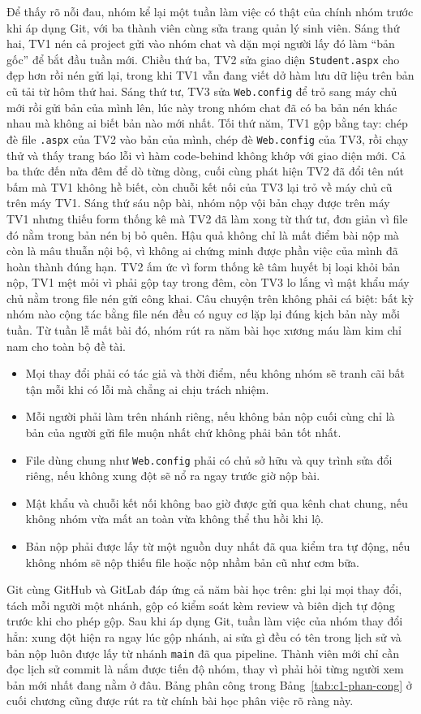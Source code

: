 Để thấy rõ nỗi đau, nhóm kể lại một tuần làm việc có thật của chính nhóm trước khi áp dụng Git, với ba thành viên cùng sửa trang quản lý sinh viên.
Sáng thứ hai, TV1 nén cả project gửi vào nhóm chat và dặn mọi người lấy đó làm ``bản gốc'' để bắt đầu tuần mới.
Chiều thứ ba, TV2 sửa giao diện \texttt{Student.aspx} cho đẹp hơn rồi nén gửi lại, trong khi TV1 vẫn đang viết dở hàm lưu dữ liệu trên bản cũ tải từ hôm thứ hai.
Sáng thứ tư, TV3 sửa \texttt{Web.config} để trỏ sang máy chủ mới rồi gửi bản của mình lên, lúc này trong nhóm chat đã có ba bản nén khác nhau mà không ai biết bản nào mới nhất.
Tối thứ năm, TV1 gộp bằng tay: chép đè file \texttt{.aspx} của TV2 vào bản của mình, chép đè \texttt{Web.config} của TV3, rồi chạy thử và thấy trang báo lỗi vì hàm code-behind không khớp với giao diện mới.
Cả ba thức đến nửa đêm để dò từng dòng, cuối cùng phát hiện TV2 đã đổi tên nút bấm mà TV1 không hề biết, còn chuỗi kết nối của TV3 lại trỏ về máy chủ cũ trên máy TV1.
Sáng thứ sáu nộp bài, nhóm nộp vội bản chạy được trên máy TV1 nhưng thiếu form thống kê mà TV2 đã làm xong từ thứ tư, đơn giản vì file đó nằm trong bản nén bị bỏ quên.
Hậu quả không chỉ là mất điểm bài nộp mà còn là mâu thuẫn nội bộ, vì không ai chứng minh được phần việc của mình đã hoàn thành đúng hạn.
TV2 ấm ức vì form thống kê tâm huyết bị loại khỏi bản nộp, TV1 mệt mỏi vì phải gộp tay trong đêm, còn TV3 lo lắng vì mật khẩu máy chủ nằm trong file nén gửi công khai.
Câu chuyện trên không phải cá biệt: bất kỳ nhóm nào cộng tác bằng file nén đều có nguy cơ lặp lại đúng kịch bản này mỗi tuần.
Từ tuần lễ mất bài đó, nhóm rút ra năm bài học xương máu làm kim chỉ nam cho toàn bộ đề tài.
\begin{itemize}
\item Mọi thay đổi phải có tác giả và thời điểm, nếu không nhóm sẽ tranh cãi bất tận mỗi khi có lỗi mà chẳng ai chịu trách nhiệm.
\item Mỗi người phải làm trên nhánh riêng, nếu không bản nộp cuối cùng chỉ là bản của người gửi file muộn nhất chứ không phải bản tốt nhất.
\item File dùng chung như \texttt{Web.config} phải có chủ sở hữu và quy trình sửa đổi riêng, nếu không xung đột sẽ nổ ra ngay trước giờ nộp bài.
\item Mật khẩu và chuỗi kết nối không bao giờ được gửi qua kênh chat chung, nếu không nhóm vừa mất an toàn vừa không thể thu hồi khi lộ.
\item Bản nộp phải được lấy từ một nguồn duy nhất đã qua kiểm tra tự động, nếu không nhóm sẽ nộp thiếu file hoặc nộp nhầm bản cũ như cơm bữa.
\end{itemize}
Git cùng GitHub và GitLab đáp ứng cả năm bài học trên: ghi lại mọi thay đổi, tách mỗi người một nhánh, gộp có kiểm soát kèm review và biên dịch tự động trước khi cho phép gộp.
Sau khi áp dụng Git, tuần làm việc của nhóm thay đổi hẳn: xung đột hiện ra ngay lúc gộp nhánh, ai sửa gì đều có tên trong lịch sử và bản nộp luôn được lấy từ nhánh \verb|main| đã qua pipeline.
Thành viên mới chỉ cần đọc lịch sử commit là nắm được tiến độ nhóm, thay vì phải hỏi từng người xem bản mới nhất đang nằm ở đâu.
Bảng phân công trong Bảng~\ref{tab:c1-phan-cong} ở cuối chương cũng được rút ra từ chính bài học phân việc rõ ràng này.

